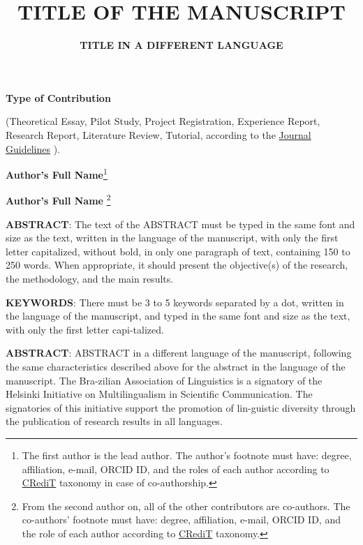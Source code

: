 \documentclass[12pt,a4paper]{article}
\title{\textbf{TITLE OF THE MANUSCRIPT}}
\author{\textbf{TITLE IN A DIFFERENT LANGUAGE}}
\date{}
\begin{document}
\maketitle


\textbf{Type of Contribution }

(Theoretical Essay, Pilot Study, Project Registration, Experience Report, Research Report, Literature Review, Tutorial, according to the \href{https://cadernos.abralin.org/index.php/cadernos/about/submissions}{Journal Guidelines}  ).
\vspace{0.5cm}

\textbf{Author’s Full Name}\footnote{The first author is the lead author. The author’s footnote must have: degree, affiliation, e-mail, ORCID ID, and the roles of each author according to \href{http://www.abralin.org/circulares/cadlin/CRediT-CadLin.pdf}{CRediT} taxonomy in case of co-authorship.}

\textbf{Author’s Full Name} \footnote{From the second author on, all of the other contributors are co-authors. The co-authors’ footnote must have: degree, affiliation, e-mail, ORCID ID, and the role of each author according to  \href{http://www.abralin.org/circulares/cadlin/CRediT-CadLin.pdf}{CRediT}  taxonomy.}

\vspace{0.5cm}

\textbf{ABSTRACT}: The text of the ABSTRACT must be typed in the same font and size as the text, written in the language of the manuscript, with only the first letter capitalized, without bold, in only one paragraph of text, containing 150 to 250 words. When appropriate, it should present the objective(s) of the research, the methodology, and the main results. 
\vspace{0.1cm}

\textbf{KEYWORDS}: There must be 3 to 5 keywords separated by a dot, written in the language of the manuscript, and typed in the same font and size as the text, with only the first letter capi-talized.
\vspace{0.5cm}

\textbf{ABSTRACT}: ABSTRACT in a different language of the manuscript, following the same characteristics described above for the abstract in the language of the manuscript. The Bra-zilian Association of Linguistics is a signatory of the Helsinki Initiative on Multilingualism in Scientific Communication. The signatories of this initiative support the promotion of lin-guistic diversity through the publication of research results in all languages. 
\vspace{0.1cm}
\end{document}
